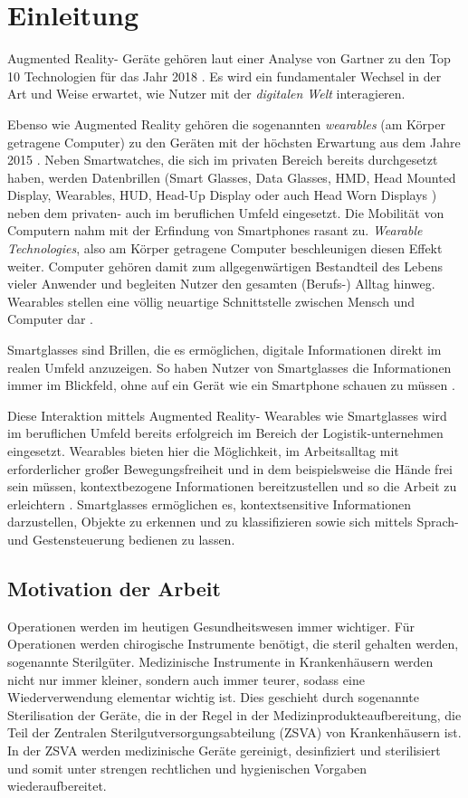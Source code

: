 
\chapter{Einleitung}
Augmented Reality- Geräte gehören laut einer Analyse von Gartner zu den Top 10 Technologien für das Jahr 2018 \cite{Panetta2017a}. Es wird ein fundamentaler Wechsel in der Art und Weise erwartet, wie Nutzer mit der \emph{digitalen Welt} interagieren. 

Ebenso wie Augmented Reality gehören die sogenannten \emph{wearables} (am Körper getragene Computer) zu den Geräten mit der höchsten Erwartung aus dem Jahre 2015 \cite{Levy2015}. Neben Smartwatches, die sich im privaten Bereich bereits durchgesetzt haben, werden Datenbrillen (Smart Glasses, Data Glasses, HMD, Head Mounted Display, Wearables, HUD, Head-Up Display oder auch Head Worn Displays \cite{Zobel2016}) neben dem privaten- auch im beruflichen Umfeld eingesetzt. 
Die Mobilität von Computern nahm mit der Erfindung von Smartphones rasant zu. \emph{Wearable Technologies}, also am Körper getragene Computer beschleunigen diesen Effekt weiter. Computer gehören damit zum allgegenwärtigen Bestandteil des Lebens vieler Anwender und begleiten Nutzer den gesamten (Berufs-) Alltag hinweg. Wearables stellen eine völlig neuartige Schnittstelle zwischen Mensch und Computer dar \cite[S.~25f]{Schwenke2016}.

Smartglasses sind Brillen, die es ermöglichen, digitale Informationen direkt im realen Umfeld anzuzeigen. So haben Nutzer von Smartglasses die Informationen immer im Blickfeld, ohne auf ein Gerät wie ein Smartphone schauen zu müssen \cite{Due2014Glasses}.

Diese Interaktion mittels Augmented Reality- Wearables wie Smartglasses wird im beruflichen Umfeld bereits erfolgreich im Bereich der Logistik-unternehmen eingesetzt. Wearables bieten hier die Möglichkeit, im Arbeitsalltag mit erforderlicher großer Bewegungsfreiheit und in dem beispielsweise die Hände frei sein müssen, kontextbezogene Informationen bereitzustellen und so die Arbeit zu erleichtern \cite{Zobel2016}. Smartglasses ermöglichen es, kontextsensitive Informationen darzustellen, Objekte zu erkennen und zu klassifizieren sowie sich mittels Sprach- und Gestensteuerung bedienen zu lassen.
%
%
\section{Motivation der Arbeit}
Operationen werden im heutigen Gesundheitswesen immer wichtiger. Für Operationen werden chirogische Instrumente benötigt, die steril gehalten werden, sogenannte Sterilgüter.
Medizinische Instrumente in Krankenhäusern werden nicht nur immer kleiner, sondern auch immer teurer, sodass eine Wiederverwendung elementar wichtig ist. Dies geschieht durch sogenannte Sterilisation der Geräte, die in der Regel in der Medizinprodukteaufbereitung, die Teil der Zentralen Sterilgutversorgungsabteilung (ZSVA) von Krankenhäusern ist. In der ZSVA werden medizinische Geräte gereinigt, desinfiziert und sterilisiert und somit unter strengen rechtlichen und hygienischen Vorgaben wiederaufbereitet. 

